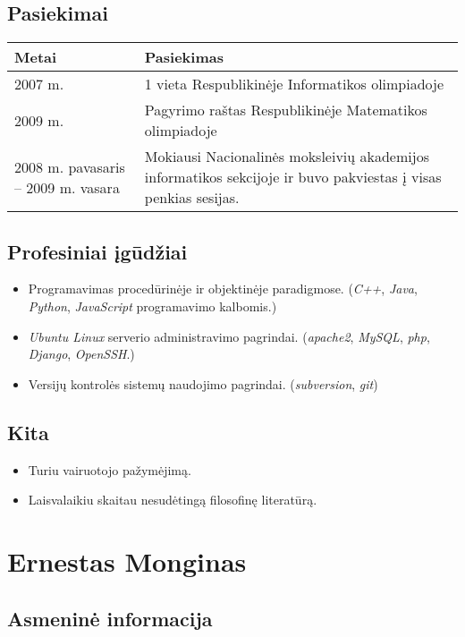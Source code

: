 \subsection{Pasiekimai}

\begin{tabular}[]{p{3cm} | p{8cm}}
  Metai & Pasiekimas \\
  \hline
  2007 m. & 1 vieta Respublikinėje Informatikos olimpiadoje \\
  2009 m. & Pagyrimo raštas Respublikinėje Matematikos olimpiadoje \\
  2008 m. pavasaris – 2009 m. vasara & Mokiausi Nacionalinės moksleivių
  akademijos informatikos sekcijoje ir buvo pakviestas į visas penkias
  sesijas. 
\end{tabular}

\subsection{Profesiniai įgūdžiai}

\begin{itemize}
  \item Programavimas procedūrinėje ir objektinėje paradigmose. 
    (\emph{C++}, \emph{Java}, \emph{Python}, \emph{JavaScript} 
    programavimo kalbomis.)
  \item \emph{Ubuntu Linux} serverio administravimo pagrindai. 
    (\emph{apache2}, \emph{MySQL}, \emph{php}, \emph{Django}, 
    \emph{OpenSSH}.)
  \item Versijų kontrolės sistemų naudojimo pagrindai. 
    (\emph{subversion}, \emph{git})
\end{itemize}

\subsection{Kita}

\begin{itemize}
  \item Turiu vairuotojo pažymėjimą.
  \item Laisvalaikiu skaitau nesudėtingą filosofinę literatūrą.
\end{itemize}

\section{Ernestas Monginas}

\subsection{Asmeninė informacija}

